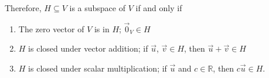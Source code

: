 \documentclass{exam}
\begin{document}
Therefore, $H\subseteq V$ is a subspace of $V$ if and only if \begin{enumerate}[label=(\alph*)]
    \item The zero vector of $V$ is in $H$; $\Vec{0}_V\in H$
    \item $H$ is closed under vector addition; if $\Vec{u}$, $\Vec{v}\in H$, then $\Vec{u}+\Vec{v}\in H$
    \item $H$ is closed under scalar multiplication; if $\Vec{u}$ and $c\in\mathbb{R}$, then $c\Vec{u}\in H$.
\end{enumerate}
\end{document}

